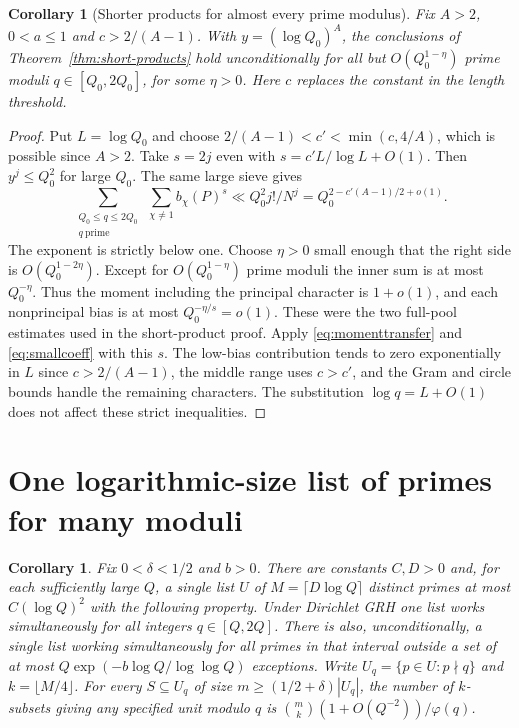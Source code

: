 \documentclass[11pt]{article}
\newtheorem{corollary}[theorem]{Corollary}
\begin{document}
\begin{corollary}[Shorter products for almost every prime modulus]
Fix $A>2$, $0<a\le1$ and $c>2/(A-1)$. With $y=(\log Q_0)^A$, the
conclusions of Theorem~\ref{thm:short-products} hold unconditionally for
all but $O(Q_0^{1-\eta})$ prime moduli $q\in[Q_0,2Q_0]$, for some
$\eta>0$. Here $c$ replaces the constant in the length threshold.
\end{corollary}
\begin{proof}
Put $L=\log Q_0$ and choose $2/(A-1)<c'<\min(c,4/A)$, which is possible
since $A>2$. Take $s=2j$ even with $s=c'L/\log L+O(1)$. Then
$y^j\le Q_0^2$ for large $Q_0$. The same large sieve gives
\[
 \sum_{\substack{Q_0\le q\le2Q_0\\ q\ \mathrm{prime}}}
 \ \sum_{\chi\ne1} b_\chi(P)^s
 \ll Q_0^2 j! /N^j=Q_0^{2-c'(A-1)/2+o(1)} .
\]
The exponent is strictly below one. Choose $\eta>0$ small enough that
the right side is $O(Q_0^{1-2\eta})$. Except for $O(Q_0^{1-\eta})$ prime
moduli the inner sum is at most $Q_0^{-\eta}$. Thus the moment including
the principal character is $1+o(1)$, and each nonprincipal bias is at
most $Q_0^{-\eta/s}=o(1)$. These were the two full-pool estimates used
in the short-product proof. Apply \eqref{eq:momenttransfer} and
\eqref{eq:smallcoeff} with this $s$. The low-bias contribution tends to
zero exponentially in $L$ since $c>2/(A-1)$, the middle range uses
$c>c'$, and the Gram and circle bounds handle the remaining characters.
The substitution $\log q=L+O(1)$ does not affect these strict inequalities.
\end{proof}
\section{One logarithmic-size list of primes for many moduli}
\begin{corollary}\label{cor:common-list}
Fix $0<\delta<1/2$ and $b>0$. There are constants $C,D>0$ and, for
each sufficiently large $Q$, a single list $U$ of $M=\lceil D\log Q\rceil$
distinct primes at most $C(\log Q)^2$ with the following property.
Under Dirichlet GRH one list works simultaneously for all integers
$q\in[Q,2Q]$. There is also, unconditionally, a single list working
simultaneously for all primes in that interval outside a set of at most
$Q\exp(-b\log Q/\log\log Q)$ exceptions.
Write $U_q=\{p\in U:p\nmid q\}$ and $k=\lfloor M/4\rfloor$.
For every $S\subseteq U_q$ of size $m\ge(1/2+\delta)|U_q|$, the
number of $k$-subsets giving any specified unit modulo $q$ is
$\binom mk(1+O(Q^{-2}))/\varphi(q)$.
\end{corollary}
\end{document}
